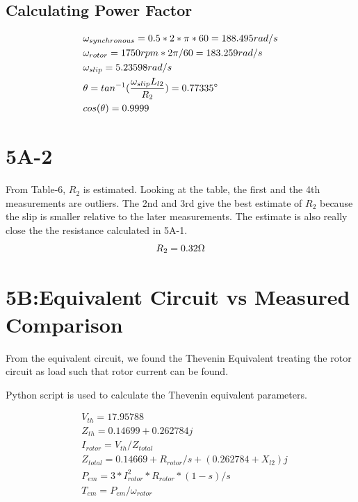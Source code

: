 \documentclass{article}
\begin{document}
    \subsection*{Calculating Power Factor}
       \begin{align*}
            &\omega_{synchronous} = 0.5 * 2 * \pi * 60 = 188.495 rad/s\\
            &\omega_{rotor} = 1750rpm * 2\pi / 60 = 183.259 rad/s\\
            &\omega_{slip} = 5.23598 rad/s\\
            &\theta = tan^{-1}(\frac{\omega_{slip}L_{l2}}{R_{2}}) = 0.77335 \degree\\
            &cos(\theta) = 0.9999
       \end{align*}
    \section*{5A-2}
    From Table-6, $R_{2}$ is estimated. Looking at the table, the first and the 4th measurements are outliers.
    The 2nd and 3rd give the best estimate of $R_{2}$ because the slip is smaller relative to the later measurements.
    The estimate is also really close the the resistance calculated in 5A-1.
    \begin{equation*}
        R_{2} = 0.32\ohm
    \end{equation*}

    \section*{5B:Equivalent Circuit vs Measured Comparison}
    From the equivalent circuit, we found the Thevenin Equivalent treating the rotor circuit as load such that 
    rotor current can be found.

    Python script is used to calculate the Thevenin equivalent parameters.
    
    \begin{align*}
        &V_{th} = 17.95788\\
        &Z_{th} = 0.14699 + 0.262784j\\
        &I_{rotor} = V_{th}/Z_{total}\\
        &Z_{total} = 0.14669 + R_{rotor}/s + (0.262784 + X_{l2})j \\
        &P_{em} = 3*I_{rotor}^{2}*R_{rotor} * (1-s) / s \\
        &T_{em} = P_{em} / \omega_{rotor}
    \end{align*}
\end{document}
